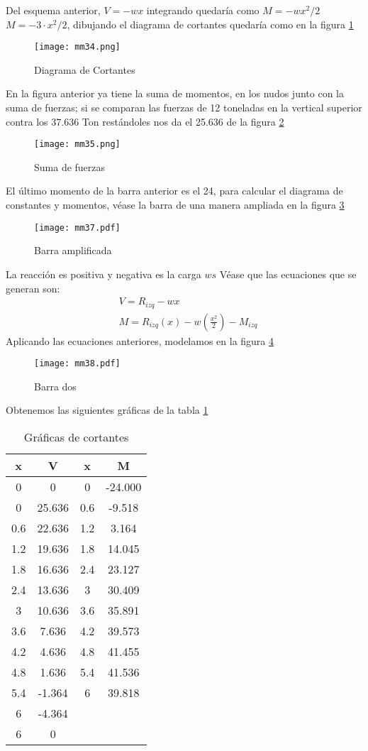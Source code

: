 Del esquema anterior, $V=-wx$ integrando quedaría como $M=-wx^2/2$ $M=-3\cdot x^2/2$, dibujando el diagrama de cortantes quedaría como en la figura \ref{mm34}
\begin{figure}[h!]
\centering
  \texttt{[image: mm34.png]}
  \caption{Diagrama de Cortantes}
  \label{mm34}
\end{figure}
En la figura anterior ya tiene la suma de momentos, en los nudos junto con la suma de fuerzas;
si se comparan las fuerzas de 12 toneladas en la vertical superior contra los 37.636 Ton restándoles nos da el 25.636 de la figura \ref{mm35}
\begin{figure}[h!]
\centering
  \texttt{[image: mm35.png]}
  \caption{Suma de fuerzas}
  \label{mm35}
\end{figure}
El último momento de la barra anterior es el 24, para calcular el diagrama de constantes y momentos, véase la barra de una manera ampliada en la figura \ref{mm37}
\begin{figure}[h!]
\centering
  \texttt{[image: mm37.pdf]}
  \caption{Barra amplificada}
  \label{mm37}
\end{figure}
La reacción es positiva y negativa es la carga $ws$ Véase que las ecuaciones que se generan son:
\begin{align*}
    &V = R_{izq} - wx\\
    &M = R_{izq}(x) -w\left(\frac{x^2}{2}\right) - M_{izq}
\end{align*}
Aplicando las ecuaciones anteriores, modelamos en la figura \ref{mm38}
\begin{figure}[h!]
\centering
  \texttt{[image: mm38.pdf]}
  \caption{Barra dos}
  \label{mm38}
\end{figure}
Obtenemos las siguientes gráficas de la tabla \ref{tabmm9}
\begin{table}[h!]
    \centering
    \begin{tabular}{@{}cccc@{}}
    \toprule
    x   & V      & x   & M       \\ \midrule
    0   & 0      & 0   & -24.000 \\
    0   & 25.636 & 0.6 & -9.518  \\
    0.6 & 22.636 & 1.2 & 3.164   \\
    1.2 & 19.636 & 1.8 & 14.045  \\
    1.8 & 16.636 & 2.4 & 23.127  \\
    2.4 & 13.636 & 3   & 30.409  \\
    3   & 10.636 & 3.6 & 35.891  \\
    3.6 & 7.636  & 4.2 & 39.573  \\
    4.2 & 4.636  & 4.8 & 41.455  \\
    4.8 & 1.636  & 5.4 & 41.536  \\
    5.4 & -1.364 & 6   & 39.818  \\
    6   & -4.364 &     &         \\
    6   & 0      &     &         \\ \bottomrule
    \end{tabular}
    \caption{Gráficas de cortantes }
    \label{tabmm9}
\end{table}
